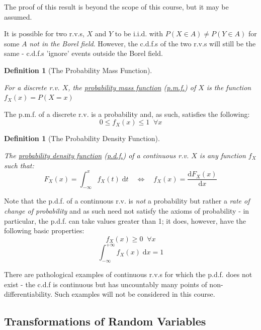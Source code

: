 \documentclass[12pt,a4paper]{article}
\newtheorem{defn}[thm]{Definition}
\begin{document}
\noindent The proof of this result is beyond the scope of this course, but it may be assumed.\par
\vspace{1cm}
\indent It is possible for two r.v.s, $X$ and $Y$ to be i.i.d. with $P(X \in A) \neq P(Y \in A)$ for some $A$ {\it not in the Borel field}. However, the c.d.f.s of the two r.v.s will still be the same - c.d.f.s 'ignore' events outside the Borel field.

\begin{defn}[The Probability Mass Function]$\;$\par
\vspace{1cm}

For a discrete r.v. $X$, the \underline{probability mass function} (\underline{p.m.f.}) of $X$ is the function $f_X(x) = P(X = x)$
\end{defn}

\noindent The p.m.f. of a discrete r.v. is a probability and, as such, satisfies the following:
$$0 \leq f_X(x) \leq 1 \;\;\forall x$$

\begin{defn}[The Probability Density Function]$\;$\par
\vspace{1cm}

The \underline{probability density function} (\underline{p.d.f.}) of a continuous r.v. $X$ is any function $f_X$ such that:
$$F_X(x) = \int_{-\infty}^x\!\!f_X(t)\;\mathrm{d}t \quad \Leftrightarrow\quad f_X(x) = \frac{\mathrm{d}F_X(x)}{\mathrm{d}x}$$
\end{defn}

Note that the p.d.f. of a continuous r.v. is {\it not} a probability but rather a {\it rate of change of probability} and as such need not satisfy the axioms of probability - in particular, the p.d.f. can take values greater than 1; it does, however, have the following basic properties:
$$f_X(x) \geq 0 \;\;\forall x$$
$$\int_{- \infty}^{+ \infty}\!\!f_X(x)\;\mathrm{d}x = 1$$

There are pathological examples of continuous r.v.s for which the p.d.f. does not exist - the c.d.f is continuous but has uncountably many points of non-differentiability. Such examples will not be considered in this course.

\subsection{Transformations of Random Variables}$\;$
\end{document}
